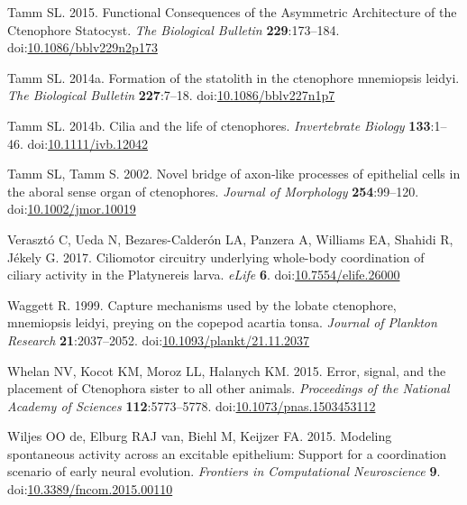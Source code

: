 \documentclass[
  11pt,
]{article}
\newlength{\cslhangindent}
\newenvironment{CSLReferences}[2] %
 {\begin{list}{}{%
  \setlength{\itemindent}{0pt}
  \setlength{\leftmargin}{0pt}
  \setlength{\parsep}{0pt}
  \ifodd #1
   \setlength{\leftmargin}{\cslhangindent}
   \setlength{\itemindent}{-1\cslhangindent}
  \fi
  \setlength{\itemsep}{#2\baselineskip}}}
 {\end{list}}
\begin{document}
\begin{CSLReferences}{1}{0}
Tamm SL. 2015. Functional Consequences of the Asymmetric Architecture of
the Ctenophore Statocyst. \emph{The Biological Bulletin}
\textbf{229}:173--184.
doi:\href{https://doi.org/10.1086/bblv229n2p173}{10.1086/bblv229n2p173}

Tamm SL. 2014a. Formation of the statolith in the ctenophore mnemiopsis
leidyi. \emph{The Biological Bulletin} \textbf{227}:7--18.
doi:\href{https://doi.org/10.1086/bblv227n1p7}{10.1086/bblv227n1p7}

Tamm SL. 2014b. Cilia and the life of ctenophores. \emph{Invertebrate
Biology} \textbf{133}:1--46.
doi:\href{https://doi.org/10.1111/ivb.12042}{10.1111/ivb.12042}

Tamm SL, Tamm S. 2002. Novel bridge of axon‐like processes of epithelial
cells in the aboral sense organ of ctenophores. \emph{Journal of
Morphology} \textbf{254}:99--120.
doi:\href{https://doi.org/10.1002/jmor.10019}{10.1002/jmor.10019}

Verasztó C, Ueda N, Bezares-Calderón LA, Panzera A, Williams EA, Shahidi
R, Jékely G. 2017. Ciliomotor circuitry underlying whole-body
coordination of ciliary activity in the Platynereis larva. \emph{eLife}
\textbf{6}.
doi:\href{https://doi.org/10.7554/elife.26000}{10.7554/elife.26000}

Waggett R. 1999. Capture mechanisms used by the lobate ctenophore,
mnemiopsis leidyi, preying on the copepod acartia tonsa. \emph{Journal
of Plankton Research} \textbf{21}:2037--2052.
doi:\href{https://doi.org/10.1093/plankt/21.11.2037}{10.1093/plankt/21.11.2037}

Whelan NV, Kocot KM, Moroz LL, Halanych KM. 2015. Error, signal, and the
placement of Ctenophora sister to all other animals. \emph{Proceedings
of the National Academy of Sciences} \textbf{112}:5773--5778.
doi:\href{https://doi.org/10.1073/pnas.1503453112}{10.1073/pnas.1503453112}

Wiljes OO de, Elburg RAJ van, Biehl M, Keijzer FA. 2015. Modeling
spontaneous activity across an excitable epithelium: Support for a
coordination scenario of early neural evolution. \emph{Frontiers in
Computational Neuroscience} \textbf{9}.
doi:\href{https://doi.org/10.3389/fncom.2015.00110}{10.3389/fncom.2015.00110}

\end{CSLReferences}
\end{document}
